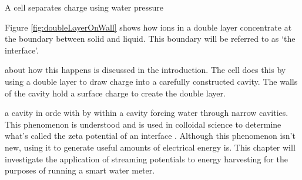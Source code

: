A cell separates charge using water pressure

Figure \ref{fig:doubleLayerOnWall} shows how ions in a double layer concentrate at the boundary between solid and liquid. 
This boundary will be referred to as `the interface'.


about how this happens is discussed in the introduction.
The cell does this by using a double layer to draw charge into a carefully constructed cavity.
The walls of the cavity hold a surface charge to create the double layer.

a cavity in orde with 
by within
a cavity forcing water through narrow cavities. This phenomenon is understood
and is used in colloidal science to determine what's called the zeta potential
of an interface \cite{Gu2000,Scales1992,Daiguji2004,VanderHeyden2006,Mala1997}.
Although this phenomenon isn't new, using it to generate useful amounts of
electrical energy is. This chapter will investigate the application of
streaming potentials to energy harvesting for the purposes of running a smart
water meter.



